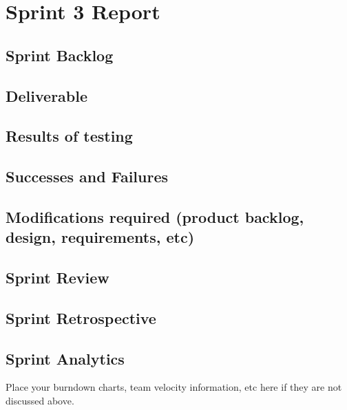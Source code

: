 
\section{Sprint 3 Report}
\subsection{Sprint Backlog}
\subsection{Deliverable}
\subsection{Results of testing}
\subsection{Successes and Failures}
\subsection{Modifications required (product backlog, design, requirements, etc)}
\subsection{Sprint Review}
\subsection{Sprint Retrospective}
\subsection{Sprint Analytics} 
Place your burndown charts, team velocity information, etc here if they are not discussed above.